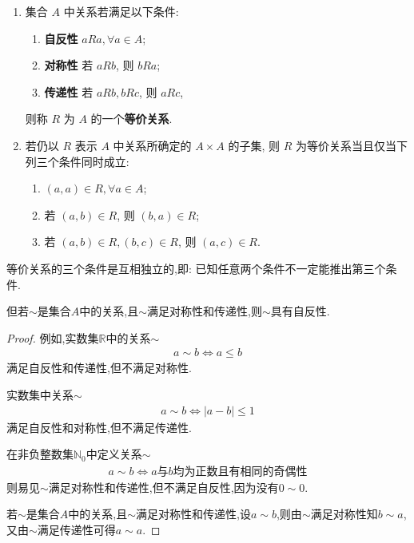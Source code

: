 \documentclass[../../main.tex]{subfiles}%
\begin{document}
\begin{definition}[等价关系]
\begin{enumerate}
\item 集合 \( A \) 中关系若满足以下条件:
\begin{enumerate}[(1)]
\item \textbf{自反性} \( aRa, \forall a \in A \);

\item \textbf{对称性} 若 \( aRb \), 则 \( bRa \);

\item \textbf{传递性} 若 \( aRb, bRc \), 则 \( aRc \),
\end{enumerate}
则称 \( R \) 为 \( A \) 的一个\textbf{等价关系}.

\item 若仍以 \( R \) 表示 \( A \) 中关系所确定的 \( A \times A \) 的子集, 则 \( R \) 为等价关系当且仅当下列三个条件同时成立:
\begin{enumerate}[(1)]
\item \( (a,a) \in R, \forall a \in A \);

\item 若 \( (a,b) \in R \), 则 \( (b,a) \in R \);

\item 若 \( (a,b) \in R, (b,c) \in R \), 则 \( (a,c) \in R \).
\end{enumerate}
\end{enumerate}
\end{definition}
\begin{remark}
等价关系的三个条件是互相独立的,即: 已知任意两个条件不一定能推出第三个条件.

但若$\sim $是集合$A$中的关系,且$\sim$满足对称性和传递性,则$\sim$具有自反性.
\begin{proof}

例如,实数集$\mathbb{R}$中的关系$\sim$
\begin{align*}
a\sim b\iff a\leqslant b
\end{align*}
满足自反性和传递性,但不满足对称性.

实数集中关系$\sim$
\begin{align*}
a \sim b \iff |a - b| \leqslant 1
\end{align*}
满足自反性和对称性,但不满足传递性.

在非负整数集$\mathbb{N}_0$中定义关系$\sim$
\begin{align*}
a \sim b \iff a\text{与}b\text{均为正数且有相同的奇偶性}
\end{align*}
则易见$\sim$满足对称性和传递性,但不满足自反性,因为没有$0 \sim 0$.

若$\sim $是集合$A$中的关系,且$\sim$满足对称性和传递性,设$a\sim b$,则由$\sim$满足对称性知$b\sim a$,又由$\sim $满足传递性可得$a\sim a$.

\end{proof}
\end{remark}
\end{document}
